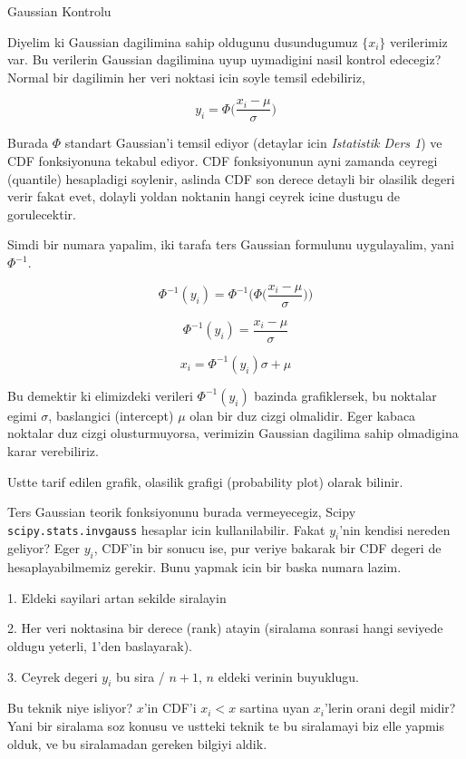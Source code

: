 \documentclass[12pt,fleqn]{article}\usepackage{../common}
\begin{document}
Gaussian Kontrolu

Diyelim ki Gaussian dagilimina sahip oldugunu dusundugumuz $\{ x_i\}$
verilerimiz var. Bu verilerin Gaussian dagilimina uyup uymadigini nasil
kontrol edecegiz? Normal bir dagilimin her veri noktasi icin soyle temsil
edebiliriz,

\[ y_i = \Phi\bigg(\frac{ x_i - \mu}{\sigma}\bigg) \]

Burada $\Phi$ standart Gaussian'i temsil ediyor (detaylar icin {\em
  Istatistik Ders 1}) ve CDF fonksiyonuna tekabul ediyor. CDF fonksiyonunun
ayni zamanda ceyregi (quantile) hesapladigi soylenir, aslinda CDF son
derece detayli bir olasilik degeri verir fakat evet, dolayli yoldan
noktanin hangi ceyrek icine dustugu de gorulecektir.

Simdi bir numara yapalim, iki tarafa ters Gaussian formulunu uygulayalim,
yani $\Phi ^{-1} $.

\[ \Phi ^{-1}(y_i) = \Phi ^{-1}\bigg(\Phi\bigg(\frac{ x_i - \mu}{\sigma}\bigg)\bigg) \]

\[ \Phi ^{-1}(y_i) = \frac{ x_i - \mu}{\sigma}\]

\[  x_i = \Phi^{-1}(y_i) \sigma + \mu  \]

Bu demektir ki elimizdeki verileri $\Phi^{-1}(y_i)$ bazinda grafiklersek,
bu noktalar egimi $\sigma$, baslangici (intercept) $\mu$ olan bir duz cizgi
olmalidir. Eger kabaca noktalar duz cizgi olusturmuyorsa, verimizin 
Gaussian dagilima sahip olmadigina karar verebiliriz. 

Ustte tarif edilen grafik,  olasilik grafigi (probability plot) olarak
bilinir. 

Ters Gaussian teorik fonksiyonunu burada vermeyecegiz, Scipy
\verb!scipy.stats.invgauss! hesaplar icin kullanilabilir. Fakat $y_i$'nin
kendisi nereden geliyor? Eger $y_i$, CDF'in bir sonucu ise, pur veriye
bakarak bir CDF degeri de hesaplayabilmemiz gerekir. Bunu yapmak icin bir
baska numara lazim. 

1. Eldeki sayilari artan sekilde siralayin

2. Her veri noktasina bir derece (rank) atayin (siralama sonrasi hangi
seviyede oldugu yeterli, 1'den baslayarak). 

3. Ceyrek degeri $y_i$ bu sira / $n+1$, $n$ eldeki verinin buyuklugu. 

Bu teknik niye isliyor? $x$'in CDF'i $x_i < x$ sartina uyan $x_i$'lerin
orani degil midir? Yani bir siralama soz konusu ve ustteki teknik te bu
siralamayi biz elle yapmis olduk, ve bu siralamadan gereken bilgiyi aldik. 
\end{document}
